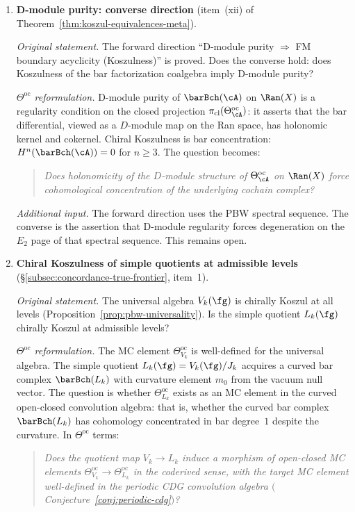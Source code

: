 \begin{enumerate}[resume, label=\textup{(\arabic*)}]

\item \textbf{D-module purity: converse direction}
 (item~(xii) of Theorem~\ref{thm:koszul-equivalences-meta}).

 \smallskip\noindent
 \emph{Original statement.}
 The forward direction
 ``D-module purity $\Rightarrow$ FM boundary acyclicity (Koszulness)''
 is proved. Does the converse hold: does Koszulness of
 the bar factorization coalgebra imply D-module purity?

 \smallskip\noindent
 \emph{$\Theta^{\mathrm{oc}}$ reformulation.}
 D-module purity of $\barBch(\cA)$ on $\Ran(X)$ is a regularity
 condition on the closed projection
 $\pi_{\mathrm{cl}}(\Theta^{\mathrm{oc}}_\cA)$: it asserts
 that the bar differential, viewed as a $D$-module map on the
 Ran space, has holonomic kernel and cokernel. Chiral
 Koszulness is bar concentration:
 $H^n(\barBch(\cA)) = 0$ for $n \geq 3$. The question
 becomes:
 \begin{quote}
 \emph{Does holonomicity of the $D$-module structure of
 $\Theta^{\mathrm{oc}}_\cA$ on $\Ran(X)$ force
 cohomological concentration of the underlying cochain
 complex?}
 \end{quote}

 \smallskip\noindent
 \emph{Additional input.}
 The forward direction uses the PBW spectral sequence. The converse
 is the assertion that D-module regularity forces degeneration on
 the $E_2$ page of that spectral sequence. This remains open.

\item \textbf{Chiral Koszulness of simple quotients at admissible levels}
 (\S\ref{subsec:concordance-true-frontier}, item~1).

 \smallskip\noindent
 \emph{Original statement.}
 The universal algebra $V_k(\fg)$ is chirally Koszul at all
 levels (Proposition~\ref{prop:pbw-universality}).
 Is the simple quotient $L_k(\fg)$ chirally Koszul at
 admissible levels?

 \smallskip\noindent
 \emph{$\Theta^{\mathrm{oc}}$ reformulation.}
 The MC element $\Theta_{V_k}^{\mathrm{oc}}$ is well-defined
 for the universal algebra. The simple quotient
 $L_k(\fg) = V_k(\fg)/J_k$ acquires a curved bar complex
 $\barBch(L_k)$ with curvature element $m_0$ from the
 vacuum null vector. The question is whether
 $\Theta^{\mathrm{oc}}_{L_k}$ exists as an MC element in the
 curved open-closed convolution algebra: that is, whether the
 curved bar complex $\barBch(L_k)$ has cohomology concentrated
 in bar degree~$1$ despite the curvature. In $\Theta^{\mathrm{oc}}$
 terms:
 \begin{quote}
 \emph{Does the quotient map $V_k \to L_k$ induce a morphism
 of open-closed MC elements
 $\Theta^{\mathrm{oc}}_{V_k} \to \Theta^{\mathrm{oc}}_{L_k}$
 in the coderived sense, with the target MC element
 well-defined in the periodic CDG convolution algebra
 $($Conjecture~\textup{\ref{conj:periodic-cdg}}$)$?}
 \end{quote}


\end{enumerate}
